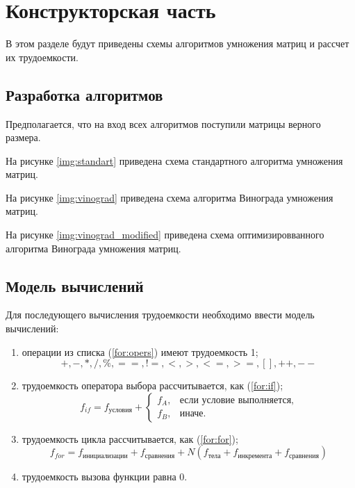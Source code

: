 \chapter{Конструкторская часть}
В этом разделе будут приведены схемы алгоритмов умножения матриц и рассчет их трудоемкости.

\section{Разработка алгоритмов}

Предполагается, что на вход всех алгоритмов поступили матрицы верного размера.

На рисунке \ref{img:standart} приведена схема стандартного алгоритма умножения матриц.

На рисунке \ref{img:vinograd} приведена схема алгоритма Винограда умножения матриц.

На рисунке \ref{img:vinograd_modified} приведена схема оптимизировванного алгоритма Винограда умножения матриц.



\section{Модель вычислений}

Для последующего вычисления трудоемкости необходимо ввести модель вычислений:
\begin{enumerate}
	\item операции из списка (\ref{for:opers}) имеют трудоемкость 1;
	\begin{equation}
		\label{for:opers}
		+, -, *, /, \%, ==, !=, <, >, <=, >=, [], ++, {-}-
	\end{equation}
	\item трудоемкость оператора выбора  рассчитывается, как (\ref{for:if});
	\begin{equation}
		\label{for:if}
		f_{if} = f_{\text{условия}} +
		\begin{cases}
			f_A, & \text{если условие выполняется,}\\
			f_B, & \text{иначе.}
		\end{cases}
	\end{equation}
	\newpage
	\item трудоемкость цикла рассчитывается, как (\ref{for:for});
	\begin{equation}
		\label{for:for}
		f_{for} = f_{\text{инициализации}} + f_{\text{сравнения}} + N(f_{\text{тела}} + f_{\text{инкремента}} + f_{\text{сравнения}})
	\end{equation}
	\item трудоемкость вызова функции равна 0.
\end{enumerate}


